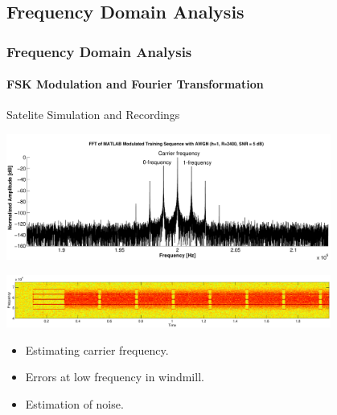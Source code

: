 
\subsection{Frequency Domain Analysis}
\begin{frame} \frametitle{Frequency Domain Analysis}
    \framesubtitle{FSK Modulation and Fourier Transformation}
    \begin{block}{Satelite Simulation and Recordings}    
        \begin{center}
            \includegraphics[width=0.8\textwidth]{img/fft_train_seq}
        \end{center}
        \begin{center}
            \includegraphics[width=0.8\textwidth]{img/packet_from_recording}
        \end{center}
        \begin{itemize}
            \item Estimating carrier frequency.
            \item Errors at low frequency in windmill.
            \item Estimation of noise.
        \end{itemize}
    \end{block}
\end{frame}

